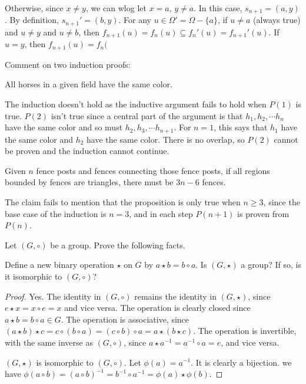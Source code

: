 \documentclass[12pt]{article}
\begin{document}
Otherwise, since $x \ne y$, we can wlog let $x = a$, $y \ne a$.
In this case, $s_{n+1} = (a,y)$.
By definition, $s _{n+1}' = (b,y)$.
For any $u \in \Omega' = \Omega - \{a\}$, if $u \ne a$ (always true) and $u \ne y$ and $u \ne b$,
then $f_{n+1}(u) = f_n(u) \subseteq f_n'(u) = f_{n+1}'(u)$.
If $u = y$, then
$f_{n+1}(u) = f_n($

\begin{question}
    Comment on two induction proofs:
\end{question}

\begin{subquestion}
    All horses in a given field have the same color.
\end{subquestion}

The induction doesn't hold as the inductive argument fails to hold
when $P(1)$ is true. $P(2)$ isn't true since a central part of the
argument is that $h_{1},h_{2},\cdots h_n$ have the same color
and so must $h_{2},h_{3},\cdots h_{n+1}$. For $n=1$, this says
that $h_{1}$ have the same color and $h_{2}$ have the same color.
There is no overlap, so $P(2)$ cannot be proven and
the induction cannot continue.

\begin{subquestion}
    Given $n$ fence posts and fences connecting those fence posts,
    if all regions bounded by fences are triangles, there must be $3n-6$ fences.
\end{subquestion}

The claim fails to mention that the proposition is
only true when $n \ge 3$, since the base case of the
induction is $n = 3$, and in each step $P(n+1)$ is proven from $P(n)$.

\begin{question}
    Let $(G,\circ)$ be a group. Prove the following facts.
\end{question}
\begin{subquestion}
    Define a new binary operation $\star$ on $G$ by $a \star b = b \circ a$.
    Is $(G,\star)$ a group? If so, is it isomorphic to $(G,\circ)$?
\end{subquestion}

\begin{proof}
    Yes. The identity in $(G,\circ)$ remains the identity in $(G,\star)$,
    since $e \star x = x \circ e = x$ and vice versa.
    The operation is clearly closed since $a \star b = b \circ a \in G$.
    The operation is associative, since
    $(a \star b) \star c = c \circ (b \circ a) = (c \circ b) \circ a = a \star (b \star c)$.
    The operation is invertible, with the same inverse as $(G,\circ)$,
    since $a \star a^{-1} = a^{-1} \circ a = e$, and vice versa.

    $(G,\star)$ is isomorphic to $(G,\circ)$. Let $\phi(a) = a^{-1}$. 
    It is clearly a bijection. we have
    $\phi(a \circ b) = (a \circ b)^{-1} = b^{-1} \circ a^{-1} = \phi(a) \star \phi(b)$.
\end{proof}
\end{document}
